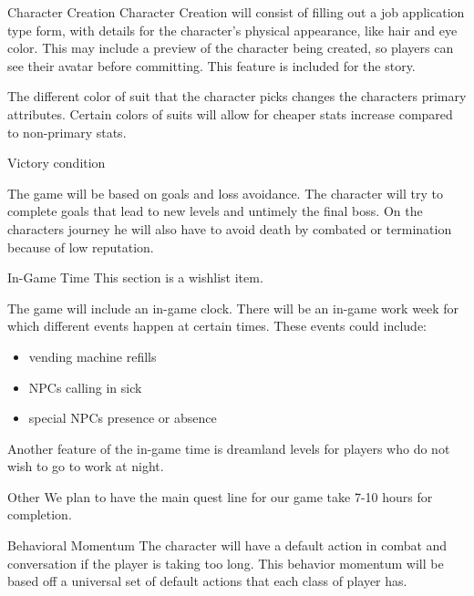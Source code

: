 \documentclass[12pt]{article}
\begin{document}
\begin{section}{Character Creation}
Character Creation will consist of filling out a job application type form, with
details for the character's physical appearance, like hair and eye color.  This
may include a preview of the character being created, so players can see
their avatar before committing. This feature is included for the story.

The different color of suit that the character picks changes the characters
primary attributes. Certain colors of suits will allow for cheaper stats
increase compared to non-primary stats.
\end{section}

\begin{section}{Victory condition}

The game will be based on goals and loss avoidance. The character will try to
complete goals that lead to new levels and untimely the final boss. On the
characters journey he will also have to avoid death by combated or termination
because of low reputation.

\begin{section}{In-Game Time}
This section is a wishlist item.

The game will include an in-game clock. There will be an in-game work week
for which different events happen at certain times. These events could include:
\begin{itemize}
	\item vending machine refills
	\item NPCs calling in sick
	\item special NPCs presence or absence
\end{itemize}

Another feature of the in-game time is dreamland levels for players who
do not wish to go to work at night.
\end{section}

\begin{section}{Other}
We plan to have the main quest line for our game take 7-10 hours for completion.
\end{section}

\newpage

\begin{section}{Behavioral Momentum}
The character will have a default action in combat and conversation if the
player is taking too long. This behavior momentum will be based off a universal
set of default actions that each class of player has.
\end{section}


\end{section}
\end{document}
